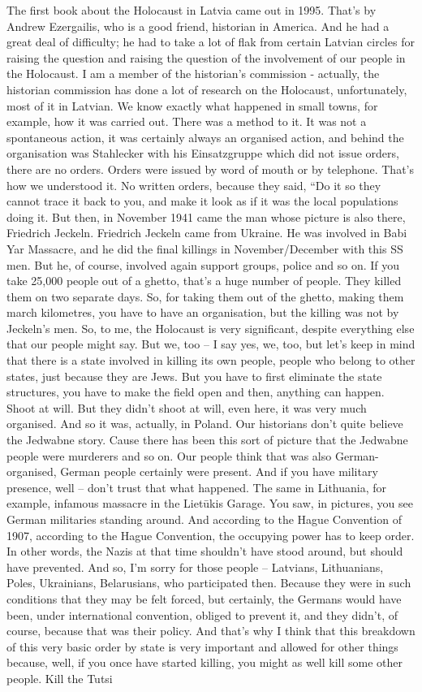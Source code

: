 The first book about the Holocaust in Latvia came out in 1995. That’s by Andrew Ezergailis, who is a good friend, historian in America. And he had a great deal of difficulty; he had to take a lot of flak from certain Latvian circles for raising the question and raising the question of the involvement of our people in the Holocaust. I am a member of the historian’s commission - actually, the historian commission has done a lot of research on the Holocaust, unfortunately, most of it in Latvian. We know exactly what happened in small towns, for example, how it was carried out. There was a method to it. It was not a spontaneous action, it was certainly always an organised action, and behind the organisation was Stahlecker with his Einsatzgruppe which did not issue orders, there are no orders. Orders were issued by word of mouth or by telephone. That’s how we understood it. No written orders, because they said, “Do it so they cannot trace it back to you, and make it look as if it was the local populations doing it. But then, in November 1941 came the man whose picture is also there, Friedrich Jeckeln. Friedrich Jeckeln came from Ukraine. He was involved in Babi Yar Massacre, and he did the final killings in November/December with this SS men. But he, of course, involved again support groups, police and so on. If you take 25,000 people out of a ghetto, that’s a huge number of people. They killed them on two separate days. So, for taking them out of the ghetto, making them march kilometres, you have to have an organisation, but the killing was not by Jeckeln’s men. So, to me, the Holocaust is very significant, despite everything else that our people might say. But we, too – I say yes, we, too, but let’s keep in mind that there is a state involved in killing its own people, people who belong to other states, just because they are Jews. But you have to first eliminate the state structures, you have to make the field open and then, anything can happen. Shoot at will. But they didn’t shoot at will, even here, it was very much organised. And so it was, actually, in Poland. Our historians don’t quite believe the Jedwabne story. Cause there has been this sort of picture that the Jedwabne people were murderers and so on. Our people think that was also German-organised, German people certainly were present. And if you have military presence, well – don’t trust that what happened. The same in Lithuania, for example, infamous massacre in the Lietūkis Garage. You saw, in pictures, you see German militaries standing around. And according to the Hague Convention of 1907, according to the Hague Convention, the occupying power has to keep order. In other words, the Nazis at that time shouldn’t have stood around, but should have prevented. And so, I’m sorry for those people – Latvians, Lithuanians, Poles, Ukrainians, Belarusians, who participated then. Because they were in such conditions that they may be felt forced, but certainly, the Germans would have been, under international convention, obliged to prevent it, and they didn’t, of course, because that was their policy. And that’s why I think that this breakdown of this very basic order by state is very important and allowed for other things because, well, if you once have started killing, you might as well kill some other people. Kill the Tutsi 